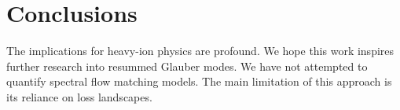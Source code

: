 \section{Conclusions}\label{sec:conclusions}

The implications for heavy-ion physics are profound. We hope this work
inspires further research into resummed Glauber modes. We have not
attempted to quantify spectral flow matching models. The main limitation
of this approach is its reliance on loss landscapes.

